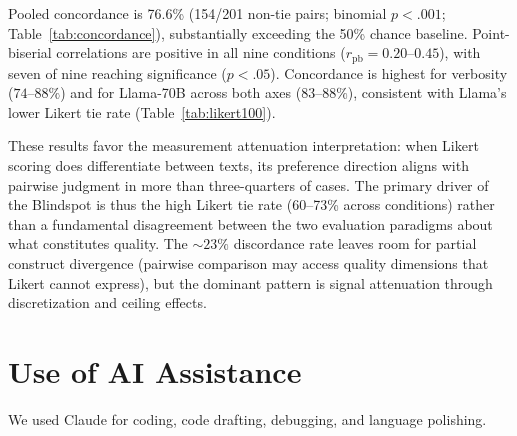 Pooled concordance is 76.6\% (154/201 non-tie pairs; binomial $p < .001$; Table~\ref{tab:concordance}), substantially exceeding the 50\% chance baseline.
Point-biserial correlations are positive in all nine conditions ($r_{\text{pb}} = 0.20$--$0.45$), with seven of nine reaching significance ($p < .05$).
Concordance is highest for verbosity ($74$--$88\%$) and for Llama-70B across both axes ($83$--$88\%$), consistent with Llama's lower Likert tie rate (Table~\ref{tab:likert100}).

These results favor the measurement attenuation interpretation: when Likert scoring does differentiate between texts, its preference direction aligns with pairwise judgment in more than three-quarters of cases.
The primary driver of the Blindspot is thus the high Likert tie rate (60--73\% across conditions) rather than a fundamental disagreement between the two evaluation paradigms about what constitutes quality.
The ${\sim}23\%$ discordance rate leaves room for partial construct divergence (pairwise comparison may access quality dimensions that Likert cannot express), but the dominant pattern is signal attenuation through discretization and ceiling effects.


\section*{Use of AI Assistance}
We used Claude for coding, code drafting, debugging, and language polishing.
